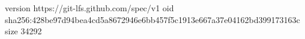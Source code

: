 version https://git-lfs.github.com/spec/v1
oid sha256:428be97d94bea4cd5a8672946e6bb457f5c1913e667a37e04162bd399173163c
size 34292
